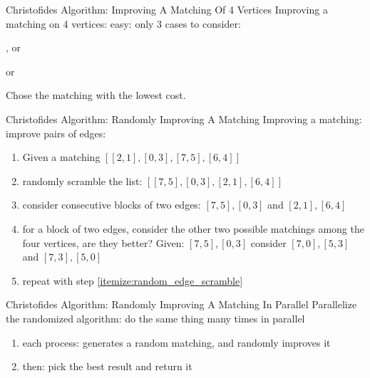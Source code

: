 \begin{frame}[t]{Christofides Algorithm: Improving A Matching Of 4 Vertices}
  \vfill
  Improving a matching on 4 vertices: easy: only 3 cases to consider:
  \vfill

  \hfill
  , \hfill or \hfill
   \hfill or \hfill

  \vfill
  Chose the matching with the lowest cost.
  \vfill
\end{frame}

\begin{frame}[t]{Christofides Algorithm: Randomly Improving A Matching}
  \vfill
  Improving a matching:\\
  improve pairs of edges:
  \begin{enumerate}
    \item Given a matching $[[2,1],[0,3],[7,5],[6,4]]$
    \item randomly scramble the list: $[[7,5],[0,3],[2,1],[6,4]]$ \label{itemize:random_edge_scramble}
    \item consider consecutive blocks of two edges: $[7,5],[0,3]$ and $[2,1],[6,4]$
    \item for a block of two edges, consider the other two possible matchings among the four vertices, are they better? Given:
      $[7,5],[0,3]$ consider $[7,0], [5,3]$ and $[7,3], [5,0]$
    \item repeat with step \ref{itemize:random_edge_scramble}
  \end{enumerate}
  \vfill
\end{frame}

\begin{frame}[t]{Christofides Algorithm: Randomly Improving A Matching In Parallel}
  \vfill
  Parallelize the randomized algorithm: do the same thing many times in parallel
  
  \begin{enumerate}
    \item each process: generates a random matching, and randomly improves it
    \item then: pick the best result and return it
  \end{enumerate}
  \vfill
\end{frame}

